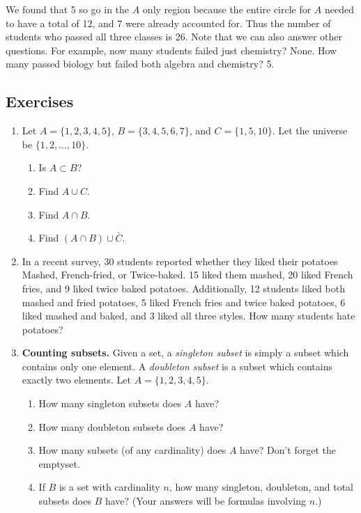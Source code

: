 We found that 5 so go in the $A$ only region because the entire circle for $A$ needed to have a total of 12, and 7 were already accounted for.  Thus the number of students who passed all three classes is 26.  Note that we can also answer other questions.  For example, now many students failed just chemistry?  None.  How many passed biology but failed both algebra and chemistry? 5.

\subsection*{Exercises}
\begin{enumerate}
 \item Let $A = \{1, 2, 3, 4, 5\}$, $B = \{3, 4, 5, 6, 7\}$, and $C = \{1, 5, 10\}$.  Let the universe be $\{1, 2, \ldots, 10\}$.
\begin{enumerate}
 \item Is $A \subset B$?
\item Find $A \cup C$.
\item Find $A \cap B$.
\item Find $(A \cap B) \cup \bar C$.
\end{enumerate}

\item In a recent survey, 30 students reported whether they liked their potatoes Mashed, French-fried, or Twice-baked.
15 liked them mashed, 20 liked French fries, and 9 liked twice baked potatoes.  Additionally, 12 students liked both mashed and fried potatoes, 5 liked French fries and twice baked potatoes, 6 liked mashed and baked, and 3 liked all three styles.  How many students hate potatoes?


\item {\bf Counting subsets.} Given a set, a {\em singleton subset} is simply a subset which contains only one element.  A {\em doubleton subset} is a subset which contains exactly two elements.  Let $A = \{1, 2, 3, 4, 5\}$. 
\begin{enumerate}
 \item How many singleton subsets does $A$ have?
\item How many doubleton subsets does $A$ have?
\item How many subsets (of any cardinality) does $A$ have?  Don't forget the emptyset.
\item If $B$ is a set with cardinality $n$, how many singleton, doubleton, and total subsets does $B$ have? (Your answers will be formulas involving $n$.)
\end{enumerate}


\end{enumerate}

